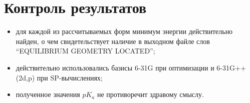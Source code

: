 \section{Контроль результатов}
\begin{itemize}
    \item для каждой из рассчитываемых форм минимум энергии действительно найден, о чем свидетельствует наличие в выходном файле слов “EQUILIBRIUM GEOMETRY LOCATED”;
    \item действительно использовались базисы 6-31G при оптимизации и 6-31G++(2d,p) при SP-вычислениях;
    \item полученное значения $pK_a$ не противоречит здравому смыслу.
\end{itemize}

